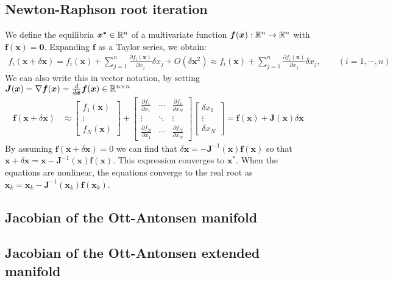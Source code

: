 \subsection{Newton-Raphson root iteration} \label{app:NewtonRaphson}
We define the equilibria $\boldsymbol{x^\ast} \in {\mathbb{R}}^n$ of a multivariate function $\boldsymbol{f}(\boldsymbol{x}) : {\mathbb{R}}^n \rightarrow {\mathbb{R}}^n$ with $\boldsymbol{f}(\boldsymbol{x}) = \boldsymbol{0}$. Expanding $\boldsymbol{f}$ as a Taylor series, we obtain:
\begin{align*}
f_i(\boldsymbol{x} + \delta \boldsymbol{x}) =f_{i}(\boldsymbol{x}) + \sum_{j=1}^{n} \frac{\partial f_{i}(\boldsymbol{x})}{\partial x_{j}} \delta x_{j}+O\left(\delta \boldsymbol{x}^{2}\right) \approx f_{i}(\boldsymbol{x})+\sum_{j=1}^{n} \frac{\partial f_{i}(\boldsymbol{x})}{\partial x_{j}} \delta x_{j}, \qquad (i=1, \cdots, n)
\end{align*}
We can also write this in vector notation, by setting $\boldsymbol{J}(\boldsymbol{x}) = \nabla \boldsymbol{f}(\boldsymbol{x}) = \frac{d}{d\boldsymbol{x}} \boldsymbol{f}(\boldsymbol{x}) \in {\mathbb{R}}^{n \times n}$ 
\begin{align*}
\boldsymbol{f}(\boldsymbol{x}+\delta \boldsymbol{x}) &\approx\left[\begin{array}{c}f_{1}(\boldsymbol{x}) \\ \vdots \\ f_{N}(\boldsymbol{x})\end{array}\right] 
+ \left[\begin{array}{ccc}\frac{\partial f_{1}}{\partial x_{1}} & \cdots & \frac{\partial f_{1}}{\partial x_{N}} \\ \vdots & \ddots & \vdots \\ \frac{\partial f_{N}}{\partial x_{1}} & \cdots & \frac{\partial f_{N}}{\partial x_{N}}\end{array}\right]
\left[\begin{array}{c}\delta x_{1} \\ \vdots \\ \delta x_{N}\end{array}\right] 
=\boldsymbol{f}(\boldsymbol{x})+\boldsymbol{J}(\boldsymbol{x}) \delta \boldsymbol{x} 
\end{align*}
By assuming $\boldsymbol{f}(\boldsymbol{x}+\delta \boldsymbol{x}) = 0$ we can find that $\delta \boldsymbol{x} = -\boldsymbol{J}^{-1}( \boldsymbol{x}) \boldsymbol{f}(\boldsymbol{x})$ so that $\boldsymbol{x} + \delta \boldsymbol{x} =  \boldsymbol{x} - \boldsymbol{J}^{-1} (\boldsymbol{x}) \boldsymbol{f}(\boldsymbol{x})$. This expression converges to $\boldsymbol{x^\ast}$. When the equations are nonlinear, the equations converge to the real root as $\boldsymbol{x}_k =  \boldsymbol{x}_k - \boldsymbol{J}^{-1} ( \boldsymbol{x}_k)\boldsymbol{f}(\boldsymbol{x}_k)$.

\subsection{Jacobian of the Ott-Antonsen manifold}
\subsection{Jacobian of the Ott-Antonsen extended manifold}







